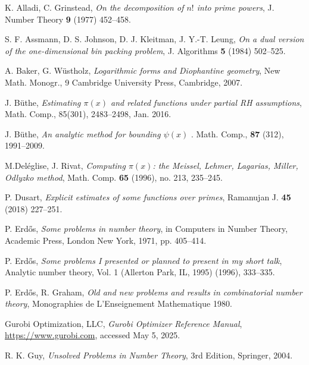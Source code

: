 \documentclass[12pt,a4paper,reqno]{amsart}
\numberwithin{equation}{section}
\theoremstyle{plain}
\theoremstyle{definition}
\begin{document}
\begin{thebibliography}{10}

  
K. Alladi, C. Grinstead, \emph{On the decomposition of $n!$ into prime powers}, J. Number Theory \textbf{9} (1977) 452--458.

S. F. Assmann, D. S. Johnson, D. J. Kleitman, J. Y.-T. Leung, \emph{On a dual version of the one-dimensional bin packing problem}, J. Algorithms \textbf{5} (1984) 502--525.

A. Baker, G. W\"ustholz, \emph{Logarithmic forms and Diophantine geometry}, New Math. Monogr., 9 Cambridge University Press, Cambridge, 2007.

J. B\"uthe, \emph{Estimating $\pi(x)$ and related functions under partial RH assumptions}, Math. Comp., 85(301), 2483--2498, Jan. 2016.

J. B\"uthe, \emph{An analytic method for bounding $\psi(x)$
}. Math. Comp., \textbf{87} (312), 1991--2009.



M.Del\'eglise, J. Rivat, \emph{Computing $\pi(x)$: the Meissel, Lehmer, Lagarias, Miller, Odlyzko method}, Math. Comp. \textbf{65} (1996), no. 213, 235--245.

P. Dusart, \emph{Explicit estimates of some functions over primes}, Ramanujan J. \textbf{45} (2018) 227--251.

P. Erd\H{o}s, \emph{Some problems in number theory}, in Computers in Number Theory, Academic Press, London New York, 1971, pp. 405--414.

P. Erd\H{o}s, \emph{Some problems I presented or planned to present in my short talk}, Analytic number theory, Vol. 1 (Allerton Park, IL, 1995) (1996), 333--335.

P. Erd\H{o}s, R. Graham, \emph{Old and new problems and results in combinatorial number theory}, Monographies de L'Enseignement Mathematique 1980.

Gurobi Optimization, LLC, \emph{Gurobi Optimizer Reference Manual}, \url{https://www.gurobi.com}, accessed May 5, 2025.

R. K. Guy, \emph{Unsolved Problems in Number Theory}, 3rd Edition, Springer, 2004.


\end{thebibliography}
\end{document}
